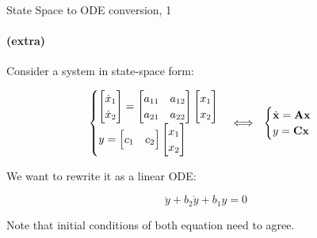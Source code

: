 \documentclass{beamer}
\begin{document}
\begin{frame}{State Space to ODE conversion, 1}
	\framesubtitle{(extra)}
	\begin{flushleft}
		
		Consider a system in state-space form:
		
		\begin{equation}
			\label{eq:SS}
			\begin{cases}
				\begin{bmatrix}
					\dot x_1 \\ 
					\dot x_2
				\end{bmatrix} 
				= 
				\begin{bmatrix}
					a_{11} & a_{12} \\ 
					a_{21} & a_{22}
				\end{bmatrix} 
				\begin{bmatrix}
					x_1 \\ 
					x_2
				\end{bmatrix} 
				\\
				y = 
				\begin{bmatrix}
					c_1 & 
					c_2
				\end{bmatrix} 
				\begin{bmatrix}
					x_1 \\ 
					x_2
				\end{bmatrix} 
			\end{cases}
			\Longleftrightarrow \ \ 
			\begin{cases}
				\dot{\bo{x}} = \bo{A} \bo{x} \\
				y = \bo{C} \bo{x} 
			\end{cases}
		\end{equation}
		
		We want to rewrite it as a linear ODE:
		
		\begin{equation}
			\label{eq:ODE}
			\ddot{y} + b_2 \dot{y} + b_1 y = 0
		\end{equation}
		
		Note that initial conditions of both equation need to agree.
		
		
	\end{flushleft}
\end{frame}
\end{document}
